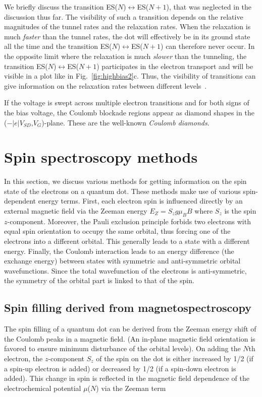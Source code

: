 \documentclass[12pt,aps,nofootinbib]{revtex4-1}
\begin{document}
We briefly discuss the transition
ES($N$)$\leftrightarrow$ES($N\!+\!1$), that was neglected in the
discussion thus far. The visibility of such a transition depends
on the relative magnitudes of the tunnel rates and the relaxation
rates. When the relaxation is much \textit{faster} than the tunnel
rates, the dot will effectively be in its ground state all the
time and the transition ES($N$)$\leftrightarrow$ES($N\!+\!1$) can
therefore never occur. In the opposite limit where the relaxation
is much \textit{slower} than the tunneling, the transition
ES($N$)$\leftrightarrow$ES($N\!+\!1$) participates in the electron
transport and will be visible in a plot like in
Fig.~\ref{fig:highbias2}c. Thus, the visibility of transitions can
give information on the relaxation rates between different
levels~\cite{FujisawaPRL02}.

If the voltage is swept across multiple electron transitions and
for both signs of the bias voltage, the Coulomb blockade regions
appear as diamond shapes in the
($-\left|e\right|V_{SD}$,${V_G}$)-plane. These are the well-known
\textit{Coulomb diamonds}.

\section{Spin spectroscopy methods}
\label{Section:SpinSpectroscopy} In this section, we discuss
various methods for getting information on the spin state of the
electrons on a quantum dot. These methods make use of various
spin-dependent energy terms. First, each electron spin is
influenced directly by an external magnetic field via the Zeeman
energy $E_Z=S_z g \mu_B B$ where $S_z$ is the spin $z$-component.
Moreover, the Pauli exclusion principle forbids two electrons with
equal spin orientation to occupy the same orbital, thus forcing
one of the electrons into a different orbital. This generally
leads to a state with a different energy. Finally, the Coulomb
interaction leads to an energy difference (the exchange energy)
between states with symmetric and anti-symmetric orbital
wavefunctions. Since the total wavefunction of the electrons is
anti-symmetric, the symmetry of the orbital part is linked to that
of the spin.

\subsection{Spin filling derived from magnetospectroscopy}
The spin filling of a quantum dot can be derived from the Zeeman
energy shift of the Coulomb peaks in a magnetic field. (An
in-plane magnetic field orientation is favored to ensure minimum
disturbance of the orbital levels). On adding the $N$th electron,
the $z$-component $S_z$ of the spin on the dot is either increased
by 1/2 (if a spin-up electron is added) or decreased by 1/2 (if a
spin-down electron is added). This change in spin is reflected in
the magnetic field dependence of the electrochemical potential
$\mu$($N$) via the Zeeman term
\end{document}
